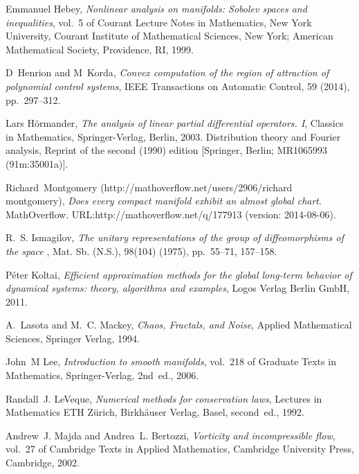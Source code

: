 \documentclass[final,leqno]{amsart}
\begin{document}
\begin{thebibliography}{10}
{\sc Emmanuel Hebey}, {\em Nonlinear analysis on manifolds: {S}obolev spaces
  and inequalities}, vol.~5 of Courant Lecture Notes in Mathematics, New York
  University, Courant Institute of Mathematical Sciences, New York; American
  Mathematical Society, Providence, RI, 1999.

{\sc D~Henrion and M~Korda}, {\em Convex computation of the region of
  attraction of polynomial control systems}, IEEE Transactions on Automatic
  Control, 59 (2014), pp.~297--312.

{\sc Lars H{\"o}rmander}, {\em The analysis of linear partial differential
  operators. {I}}, Classics in Mathematics, Springer-Verlag, Berlin, 2003.
\newblock Distribution theory and Fourier analysis, Reprint of the second
  (1990) edition [Springer, Berlin; MR1065993 (91m:35001a)].

{\sc Richard~Montgomery (http://mathoverflow.net/users/2906/richard
  montgomery)}, {\em Does every compact manifold exhibit an almost global
  chart}.
\newblock MathOverflow.
\newblock URL:http://mathoverflow.net/q/177913 (version: 2014-08-06).

{\sc R.~S. Ismagilov}, {\em The unitary representations of the group of
  diffeomorphisms of the space {} {}}, Mat. Sb. (N.S.),
  98(104) (1975), pp.~55--71, 157--158.

{\sc P{\'e}ter Koltai}, {\em Efficient approximation methods for the global
  long-term behavior of dynamical systems: theory, algorithms and examples},
  Logos Verlag Berlin GmbH, 2011.

{\sc A.~Lasota and M.~C. Mackey}, {\em Chaos, Fractals, and Noise}, Applied
  Mathematical Sciences, Springer Verlag, 1994.

{\sc John~M Lee}, {\em Introduction to smooth manifolds}, vol.~218 of Graduate
  Texts in Mathematics, Springer-Verlag, 2nd~ed., 2006.

{\sc Randall~J. LeVeque}, {\em Numerical methods for conservation laws},
  Lectures in Mathematics ETH Z\"urich, Birkh\"auser Verlag, Basel, second~ed.,
  1992.

{\sc Andrew~J. Majda and Andrea~L. Bertozzi}, {\em Vorticity and incompressible
  flow}, vol.~27 of Cambridge Texts in Applied Mathematics, Cambridge
  University Press, Cambridge, 2002.


\end{thebibliography}
\end{document}
